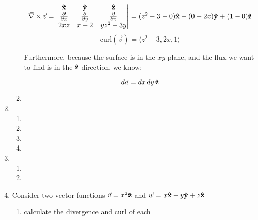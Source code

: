 \begin{enumerate}
\begin{enumerate}
        $$\vec{\nabla}\times\vec{v}=\left|\begin{matrix}\bold{\hat{x}} & \bold{\hat{y}} & \bold{\hat{z}}\\ \frac{\partial}{\partial x} & \frac{\partial}{\partial y} & \frac{\partial}{\partial z}\\ 2xz & x+2 & yz^2-3y\end{matrix}\right|=(z^2-3-0)\bold{\hat{x}}-(0-2x)\bold{\hat{y}}+(1-0)\bold{\hat{z}}$$
        $$\text{curl}(\vec{v})=\langle z^2-3,2x,1\rangle$$

        Furthermore, because the surface is in the $xy$ plane, and the flux we want to find is in the $\bold{\hat{z}}$ direction, we know:

        $$d\vec{a}=dx\,dy\,\bold{\hat{z}}$$

      \item 

    \end{enumerate}

  \item 

    \begin{enumerate}

      \item 

      \item 

      \item 

      \item 

    \end{enumerate}

  \item 

    \begin{enumerate}

      \item 

      \item 

    \end{enumerate}

  \item Consider two vector functions $\vec{v}=x^2\bold{\hat{z}}$ and $\vec{w}=x\bold{\hat{x}}+y\bold{\hat{y}}+z\bold{\hat{z}}$

    \begin{enumerate}

      \item calculate the divergence and curl of each


\end{enumerate}
\end{enumerate}
